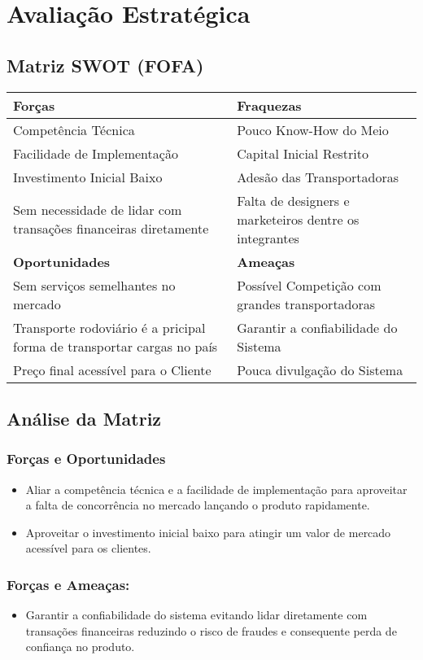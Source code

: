 \chapter{Avaliação Estratégica}

\section{Matriz SWOT (FOFA)}
  \begin{tabular}{|p{8.0cm}|p{8.0cm}|}
  \hline
   \textbf{Forças} & \textbf{Fraquezas}\\ \hline
    Competência Técnica & Pouco Know-How do Meio \\ \hline
   Facilidade de Implementação & Capital Inicial Restrito \\ \hline
   Investimento Inicial Baixo & Adesão das Transportadoras\\ \hline
   Sem necessidade de lidar com transações financeiras diretamente &  Falta de designers e marketeiros dentre os integrantes \\ \hline
    \textbf{Oportunidades} & \textbf{Ameaças}\\ \hline
Sem serviços semelhantes no mercado & Possível Competição com grandes transportadoras\\ \hline
Transporte rodoviário é a pricipal  forma de transportar cargas no país & Garantir a confiabilidade do Sistema \\ \hline
   Preço final acessível para o Cliente & Pouca divulgação do Sistema\\ \hline
  \end{tabular}
 \section{Análise da Matriz}
 
\subsection{Forças e Oportunidades}
\begin{itemize}
 \item Aliar a competência técnica e a facilidade de implementação para aproveitar a falta de
concorrência no mercado lançando o produto rapidamente.
 \item Aproveitar o investimento inicial baixo para atingir um valor de mercado acessível para os clientes.
\end{itemize}
\subsection{Forças e Ameaças:}
\begin{itemize}
\item Garantir a confiabilidade do sistema evitando lidar diretamente com transações financeiras reduzindo o risco de fraudes e consequente perda de confiança no produto.
\end{itemize}
